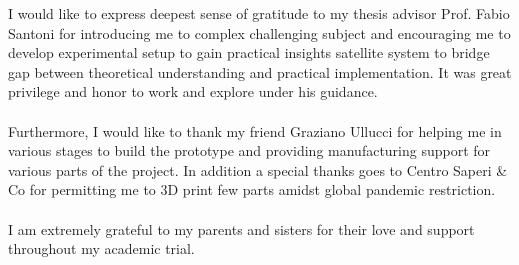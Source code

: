 \documentclass[english,oneside,LaM,binding=0.0cm]{sapthesis}
\begin{document}
\begin{abstract}
\end{abstract}

\begin{acknowledgments}
{}
I would like to express deepest sense of gratitude to my thesis advisor Prof. Fabio Santoni for introducing me to complex challenging subject and encouraging me to develop experimental setup to gain practical insights satellite system to bridge gap between theoretical understanding and practical implementation. It was great privilege and honor to work and explore under his guidance. \\
\\
Furthermore, I would like to thank my friend Graziano Ullucci for helping me in various stages to build the prototype and providing manufacturing support for various parts of the project. In addition a special thanks goes to Centro Saperi & Co for permitting me to 3D print few parts amidst global pandemic restriction. \\
\\
I am extremely grateful to my parents and sisters for their love and support throughout my academic trial.

\end{acknowledgments}
\begin{comment}

\newglossaryentry{policy}{
    name = policy,
    description = neural network which produces appropriate actions.
}
\end{comment}



\renewcommand{\contentsname}{Table of Contents}
\tableofcontents

\listoftables

\listoffigures


\printacronyms[type=\acronymtype, title=List of Acronyms]




\nomlabelwidth=25mm 

\renewcommand\nomgroup[1]{%
  \item[\bfseries
  \ifstrequal{#1}{A}{Spacecraft Attitude Dynamics}{%
  \ifstrequal{#1}{B}{AI based Learning Agent}{%
  \ifstrequal{#1}{C}{Other Symbols}{}}}%
]}
\end{document}
